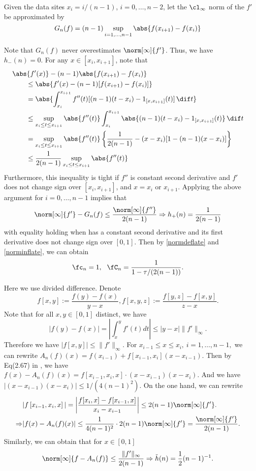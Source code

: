 Given the data sites $x_i=i/(n-1)$, $i=0, \ldots, n-2$, let the $\cl_\infty$ norm of the $f'$ be approximated by
\begin{equation}\label{estfirstderiv}
G_n(f) = (n-1) \sup_{i=1, \ldots, n-1} \abs{f(x_{i+1})-f(x_i)}
\end{equation}

Note that $G_n(f)$ never overestimates $\norm[\infty]{f'}$. Thus, we have
$h_{-}(n)=0.$
For any $x \in [x_{i}, x_{i+1}]$, note that
\begin{align*}
\MoveEqLeft{\abs{f'(x)} - (n-1) \abs{f(x_{i+1})-f(x_i)}} \\
 & \le \abs{f'(x) - (n-1)[f(x_{i+1})-f(x_i)]} \\
&=\abs{ \int_{x_i}^{x_{i+1}} f''(t) [(n-1)(t-x_i) -  1_{[x,x_{i+1}]}(t)] \, \dif t} \\
& \le \sup_{x_i \le t \le x_{i+1}} \abs{f''(t)} \int_{x_i}^{x_{i+1}} \abs{  (n-1)(t-x_i) -  1_{[x,x_{i+1}]}(t)} \, \dif t \\
&=\sup_{x_i \le t \le x_{i+1}} \abs{f''(t)} \left \{\frac{1}{2(n-1)} - (x-x_i)[1-(n-1)(x-x_i)] \right\} \\
&\le \frac{1}{2(n-1)}\sup_{x_i \le t \le x_{i+1}} \abs{f''(t)}
\end{align*}
Furthermore, this inequality is tight if $f''$ is constant second derivative and $f'$ does not change sign over $[x_{i}, x_{i+1}]$, and $x=x_i$ or $x_{i+1}$.  Applying the above argument for $i=0, \ldots, n-1$ implies that
\[
\norm[\infty]{f'} - G_n(f) \le \frac{\norm[\infty]{f''}}{2(n-1)} \Rightarrow h_{+}(n)=\frac{1}{2(n-1)}
\]
with equality holding when has a constant second derivative and its first derivative does not change sign over $[0,1]$.
Then by \eqref{normdeflate} and \eqref{norminflate}, we can obtain
\begin{equation}\label{inflaapprox}
\fc_n=1, \ \   \fC_n =\frac{1}{1 - \tau /(2(n-1))}.
\end{equation}

Here we use divided difference. Denote
$$f[x,y]:=\frac{f(y)-f(x)}{y-x},f[x,y,z]:=\frac{f[y,z]-f[x,y]}{z-x}.$$
Note that for all $x,y \in [0,1]$ distinct, we have
 $$|f(y)-f(x)|=\left|\int_{x}^{y}f'(t)dt\right| \leq |y-x|\|f'\|_{\infty}.$$
 Therefore we have $|f[x,y]|\leq \|f'\|_{\infty}.$
For $x_{i-1} \leq x \leq x_i, \ i=1, \ldots, n-1,$ we  can rewrite
$A_{n}(f)(x)=f\left(x_{i-1}\right)+f\left[x_{i-1},x_{i}\right]\left(x-x_{i-1}\right).$
Then by Eq(2.67) in \cite{walter}, we have
$
f(x)-A_{n}(f)(x)
=f\left[x_{i-1},x_{i},x\right]\cdot (x-x_{i-1})(x-x_i).
$
And we have
$\left|(x-x_{i-1})(x-x_{i})\right| \leq 1/(4(n-1)^2).$
On the one hand, we can rewrite
\begin{align*}&|f\left[x_{i-1},x_{i},x\right]|=\left|\frac{f[x_{i},x]-f[x_{i-1},x]}{x_i-x_{i-1}}\right|\leq2(n-1)\norm[\infty]{f'}.\\
\Rightarrow & |f(x)-A_{n}(f)(x)|\leq \frac{1}{4(n-1)^2}\cdot 2(n-1)\norm[\infty]{f'}=\frac{\norm[\infty]{f'}}{2(n-1)}.
\end{align*}
Similarly, we can obtain that for $x \in [0,1]$
$$\norm[\infty]{f-A_{n}(f)} \leq \frac{\|f'\|_{\infty}}{2(n-1)} \Rightarrow \tilde{h}(n)=\frac{1}{2}(n-1)^{-1}.$$

